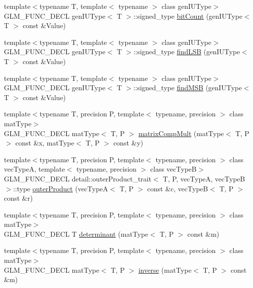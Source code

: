 \begin{CompactItemize}
\item 
{\footnotesize template$<$typename T, template$<$ typename $>$ class genIUType$>$ }\\GLM\_\-FUNC\_\-DECL genIUType$<$ T $>$::signed\_\-type \hyperlink{group__core__func__integer_gccacb39d16885cc32fd8d5c95ab49da8}{bitCount} (genIUType$<$ T $>$ const \&Value)
\item 
{\footnotesize template$<$typename T, template$<$ typename $>$ class genIUType$>$ }\\GLM\_\-FUNC\_\-DECL genIUType$<$ T $>$::signed\_\-type \hyperlink{group__core__func__integer_gdda1c11511dea60cd3f0b414d8baa9c2}{findLSB} (genIUType$<$ T $>$ const \&Value)
\item 
{\footnotesize template$<$typename T, template$<$ typename $>$ class genIUType$>$ }\\GLM\_\-FUNC\_\-DECL genIUType$<$ T $>$::signed\_\-type \hyperlink{group__core__func__integer_g13ed58e71232a63dbc132b1be0f0ee9a}{findMSB} (genIUType$<$ T $>$ const \&Value)
\item 
{\footnotesize template$<$typename T, precision P, template$<$ typename, precision $>$ class matType$>$ }\\GLM\_\-FUNC\_\-DECL matType$<$ T, P $>$ \hyperlink{group__core__func__matrix_g30bbe46a821497b9ae0c63a2d27db0b2}{matrixCompMult} (matType$<$ T, P $>$ const \&x, matType$<$ T, P $>$ const \&y)
\item 
{\footnotesize template$<$typename T, precision P, template$<$ typename, precision $>$ class vecTypeA, template$<$ typename, precision $>$ class vecTypeB$>$ }\\GLM\_\-FUNC\_\-DECL detail::outerProduct\_\-trait$<$ T, P, vecTypeA, vecTypeB $>$::type \hyperlink{group__core__func__matrix_g47818f9809502f7a975a2c43a61fedb3}{outerProduct} (vecTypeA$<$ T, P $>$ const \&c, vecTypeB$<$ T, P $>$ const \&r)
\item 
{\footnotesize template$<$typename T, precision P, template$<$ typename, precision $>$ class matType$>$ }\\GLM\_\-FUNC\_\-DECL T \hyperlink{group__core__func__matrix_g704c9bfebc2533c6715691de6473f90b}{determinant} (matType$<$ T, P $>$ const \&m)
\item 
{\footnotesize template$<$typename T, precision P, template$<$ typename, precision $>$ class matType$>$ }\\GLM\_\-FUNC\_\-DECL matType$<$ T, P $>$ \hyperlink{group__core__func__matrix_g4b56decdc6560a13b616c6312bdcc17e}{inverse} (matType$<$ T, P $>$ const \&m)
\item 

\end{CompactItemize}
